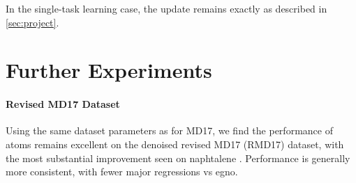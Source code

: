 In the single-task learning case, the update remains exactly as described in \cref{sec:project}.

\section{Further Experiments}
\paragraph{Revised MD17 Dataset}
Using the same dataset parameters as for MD17, we find the performance of \gls{atoms} remains excellent on the denoised revised MD17 (RMD17) dataset, with the most substantial improvement seen on naphtalene \cite{christensen_revised_2020}. Performance is generally more consistent, with fewer major regressions vs \gls{egno}.

